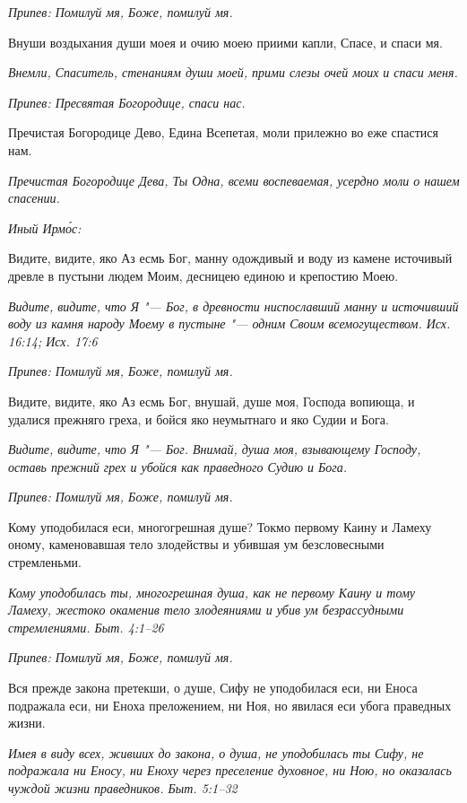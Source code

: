 \itshape Припев:\normalfont{} Помилуй мя, Боже, помилуй мя.


Внуши воздыхания души моея и очию моею приими капли, Спасе, и спаси мя.


\itshape Внемли, Спаситель, стенаниям души моей, прими слезы очей моих и спаси меня.\normalfont{}


\itshape Припев:\normalfont{} Пресвятая Богородице, спаси нас.


Пречистая Богородице Дево, Едина Всепетая, моли прилежно во еже спастися нам.


\itshape Пречистая Богородице Дева, Ты Одна, всеми воспеваемая, усердно моли о нашем спасении.\normalfont{}


\itshape Иный Ирмо́с:\normalfont{}


Видите, видите, яко Аз есмь Бог, манну одождивый и воду из камене источивый древле в пустыни людем Моим, десницею единою и крепостию Моею.


\itshape Видите, видите, что Я "--- Бог, в древности ниспославший манну и источивший воду из камня народу Моему в пустыне "--- одним Своим всемогуществом. Исх. 16:14; Исх. 17:6\normalfont{}


\itshape Припев:\normalfont{} Помилуй мя, Боже, помилуй мя.


Видите, видите, яко Аз есмь Бог, внушай, душе моя, Господа вопиюща, и удалися прежняго греха, и бойся яко неумытнаго и яко Судии и Бога.


\itshape Видите, видите, что Я "--- Бог. Внимай, душа моя, взывающему Господу, оставь прежний грех и убойся как праведного Судию и Бога.\normalfont{}


\itshape Припев:\normalfont{} Помилуй мя, Боже, помилуй мя.


Кому уподобилася еси, многогрешная душе? Токмо первому Каину и Ламеху оному, каменовавшая тело злодействы и убившая ум безсловесными стремленьми.


\itshape Кому уподобилась ты, многогрешная душа, как не первому Каину и тому Ламеху, жестоко окаменив тело злодеяниями и убив ум безрассудными стремлениями. Быт. 4:1–26\normalfont{}


\itshape Припев:\normalfont{} Помилуй мя, Боже, помилуй мя.


Вся прежде закона претекши, о душе, Сифу не уподобилася еси, ни Еноса подражала еси, ни Еноха преложением, ни Ноя, но явилася еси убога праведных жизни.


\itshape Имея в виду всех, живших до закона, о душа, не уподобилась ты Сифу, не подражала ни Еносу, ни Еноху через преселение духовное, ни Ною, но оказалась чуждой жизни праведников. Быт. 5:1–32\normalfont{}



